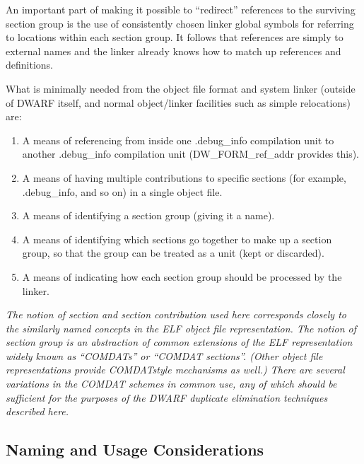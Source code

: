 An important part of making it possible to “redirect”
references to the surviving section group is the use of
consistently chosen linker global symbols for referring to
locations within each section group. It follows that references
are simply to external names and the linker already knows
how to match up references and definitions.

What is minimally needed from the object file format and system
linker (outside of DWARF itself, and normal object/linker
facilities such as simple relocations) are:

\begin{enumerate}[1.]

\item A means of referencing from inside one .debug\_info
compilation unit to another .debug\_info compilation unit
(DW\_FORM\_ref\_addr provides this).

\item A means of having multiple contributions to specific sections
(for example, .debug\_info, and so on) in a single object file.

\item  A means of identifying a section group (giving it a name).

\item A means of identifying which sections go together to make
up a section group, so that the group can be treated as a unit
(kept or discarded).

\item  A means of indicating how each section group should be
processed by the linker.

\end{enumerate}

\textit{The notion of section and section contribution used here
corresponds closely to the similarly named concepts in the
ELF object file representation. The notion of section group is
an abstraction of common extensions of the ELF representation
widely known as ``COMDATs'' or ``COMDAT sections''. (Other
object file representations provide COMDAT\dash style mechanisms as
well.) There are several variations in the COMDAT schemes in
common use, any of which should be sufficient for the purposes
of the DWARF duplicate elimination techniques described here.}

\subsection{Naming and Usage Considerations}
\label{app:namingandusageconsiderations}

